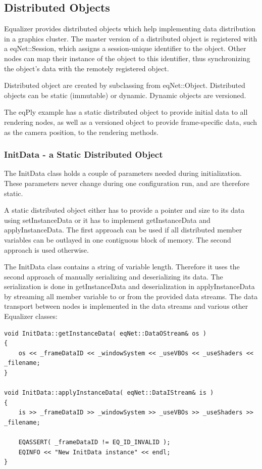 \documentclass[10pt,a4]{scrartcl}
\begin{document}
\subsection{Distributed Objects}

Equalizer provides distributed objects which help implementing data
distribution in a graphics cluster. The master version of a distributed
object is registered with a \textsf{eqNet::Session}, which assigns a
session-unique identifier to the object. Other nodes can map their
instance of the object to this identifier, thus synchronizing the
object's data with the remotely registered object.

Distributed object are created by subclassing from
\textsf{eqNet::Object}. Distributed objects can be static (immutable) or
dynamic. Dynamic objects are versioned.

The \textsf{eqPly} example has a static distributed object to provide
initial data to all rendering nodes, as well as a versioned object to
provide frame-specific data, such as the camera position, to the
rendering methods.

\subsubsection{InitData - a Static Distributed Object}

The \textsf{InitData} class holds a couple of parameters needed during
initialization. These parameters never change during one configuration
run, and are therefore static.

A static distributed object either has to provide a pointer and size to
its data using \textsf{setInstanceData} or it has to implement
\textsf{getInstanceData} and \textsf{applyInstanceData}. The first
approach can be used if all distributed member variables can be outlayed
in one contiguous block of memory. The second approach is used
otherwise.

The \textsf{InitData} class contains a string of variable
length. Therefore it uses the second approach of manually serializing
and deserializing its data. The serialization is done in
\textsf{getInstanceData} and deserialization in
\textsf{applyInstanceData} by streaming all member variable to or from
the provided data streams. The data transport between nodes is
implemented in the data streams and various other Equalizer classes:

{\footnotesize\begin{lstlisting}
void InitData::getInstanceData( eqNet::DataOStream& os )
{
    os << _frameDataID << _windowSystem << _useVBOs << _useShaders << _filename;
}

void InitData::applyInstanceData( eqNet::DataIStream& is )
{
    is >> _frameDataID >> _windowSystem >> _useVBOs >> _useShaders >> _filename;

    EQASSERT( _frameDataID != EQ_ID_INVALID );
    EQINFO << "New InitData instance" << endl;
}
\end{lstlisting}}%
\end{document}
